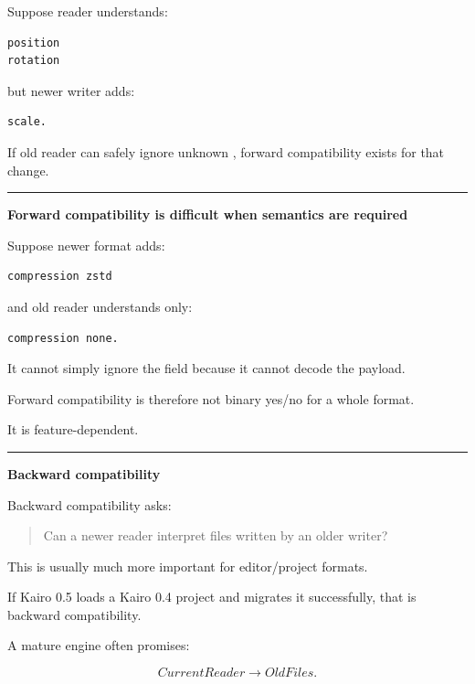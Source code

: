 Suppose reader understands:

\begin{verbatim}
position
rotation
\end{verbatim}

but newer writer adds:

\begin{verbatim}
scale.
\end{verbatim}

If old reader can safely ignore unknown , forward compatibility exists for that change.

\begin{center}\rule{0.5\linewidth}{0.5pt}\end{center}

\textbf{Forward compatibility is difficult when semantics are required}

Suppose newer format adds:

\begin{verbatim}
compression zstd
\end{verbatim}

and old reader understands only:

\begin{verbatim}
compression none.
\end{verbatim}

It cannot simply ignore the field because it cannot decode the payload.

Forward compatibility is therefore not binary yes/no for a whole format.

It is feature-dependent.

\begin{center}\rule{0.5\linewidth}{0.5pt}\end{center}

\textbf{Backward compatibility}

Backward compatibility asks:

\begin{quote}
Can a newer reader interpret files written by an older writer?
\end{quote}

This is usually much more important for editor/project formats.

If Kairo 0.5 loads a Kairo 0.4 project and migrates it successfully, that is backward compatibility.

A mature engine often promises:

\[
CurrentReader
\rightarrow
OldFiles.
\]

